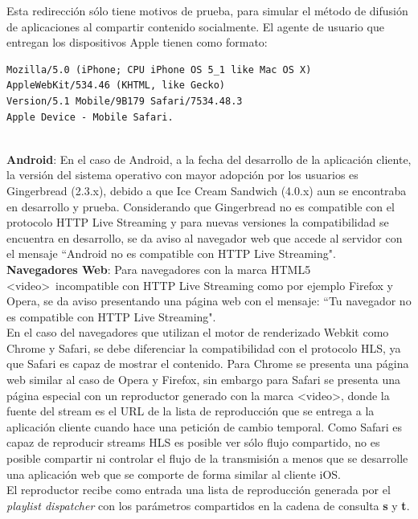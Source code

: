 Esta redirección sólo tiene motivos de prueba, para simular el método de difusión de aplicaciones al compartir contenido socialmente.
El agente de usuario que entregan los dispositivos Apple tienen como formato: 
	\begin {lstlisting}
Mozilla/5.0 (iPhone; CPU iPhone OS 5_1 like Mac OS X) 
AppleWebKit/534.46 (KHTML, like Gecko) 
Version/5.1 Mobile/9B179 Safari/7534.48.3
Apple Device - Mobile Safari.
\end{lstlisting} 
~\\ %

\textbf{Android}: En el caso de Android, a la fecha del desarrollo de la aplicación cliente, la versión del sistema operativo con mayor adopción por los usuarios es Gingerbread (2.3.x), debido a que Ice Cream Sandwich (4.0.x) aun se encontraba en desarrollo y prueba. Considerando que Gingerbread no es compatible con el protocolo HTTP Live Streaming y para nuevas versiones la compatibilidad se encuentra en desarrollo, se da aviso al navegador web que accede al servidor con el mensaje \textquotedblleft Android no es compatible con HTTP Live Streaming".\\

\textbf{Navegadores Web}:
Para navegadores con la marca HTML5 \textless video\textgreater \ incompatible con HTTP Live Streaming como por ejemplo Firefox y Opera, se da aviso presentando una página web con el mensaje: \textquotedblleft Tu navegador no es compatible con HTTP Live Streaming". \\

En el caso del navegadores que utilizan el motor de renderizado Webkit como Chrome y Safari, se debe diferenciar la compatibilidad con el protocolo HLS, ya que Safari es capaz de mostrar el contenido. Para Chrome se presenta una página web similar al caso de Opera y Firefox, sin embargo para Safari se presenta una página especial con un reproductor generado con la marca \textless video\textgreater , donde la fuente del stream es el URL de la lista de reproducción que se entrega a la aplicación cliente cuando hace una petición de cambio temporal. Como Safari es capaz de reproducir streams HLS es posible ver sólo flujo compartido, no es posible compartir ni controlar el flujo de la transmisión a menos que se desarrolle una aplicación web que se comporte de forma similar al cliente iOS.\\

El reproductor recibe como entrada una lista de reproducción generada por el \textit{playlist dispatcher} con los parámetros compartidos en la cadena de consulta \textbf{s} y \textbf{t}.



		
		